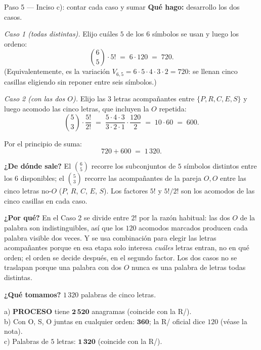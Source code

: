 \documentclass[11pt]{article}
\begin{document}
\begin{paso}{Paso 5 --- Inciso c): contar cada caso y sumar}
\textbf{Qué hago:} desarrollo los dos casos.

\emph{Caso 1 (todas distintas).} Elijo cuáles $5$ de los $6$ símbolos se usan y luego los ordeno:
\[
\binom{6}{5}\cdot 5! \;=\; 6\cdot 120 \;=\; 720 .
\]
(Equivalentemente, es la variación $V_{6,5}=6\cdot5\cdot4\cdot3\cdot2=720$: se llenan cinco casillas eligiendo
sin reponer entre seis símbolos.)

\emph{Caso 2 (con las dos $O$).} Elijo las $3$ letras acompañantes entre $\{P,R,C,E,S\}$ y luego acomodo las
cinco letras, que incluyen la $O$ repetida:
\[
\binom{5}{3}\cdot\frac{5!}{2!} \;=\; \frac{5\cdot4\cdot3}{3\cdot2\cdot1}\cdot\frac{120}{2}
\;=\; 10\cdot 60 \;=\; 600 .
\]

Por el principio de suma:
\[
720 + 600 \;=\; 1\,320 .
\]

\textbf{¿De dónde sale?} El $\binom{6}{5}$ recorre los subconjuntos de $5$ símbolos distintos entre los $6$
disponibles; el $\binom{5}{3}$ recorre las acompañantes de la pareja $O,O$ entre las cinco letras no-$O$
($P$, $R$, $C$, $E$, $S$). Los factores $5!$ y $5!/2!$ son los acomodos de las cinco casillas en cada caso.

\textbf{¿Por qué?} En el Caso 2 se divide entre $2!$ por la razón habitual: las dos $O$ de la palabra son
indistinguibles, así que los $120$ acomodos marcados producen cada palabra visible dos veces. Y se usa
combinación para elegir las letras acompañantes porque en esa etapa solo interesa \emph{cuáles} letras
entran, no en qué orden; el orden se decide después, en el segundo factor. Los dos casos no se traslapan
porque una palabra con dos $O$ nunca es una palabra de letras todas distintas.

\textbf{¿Qué tomamos?} $1\,320$ palabras de cinco letras.
\end{paso}

\begin{resp}
a) \textbf{PROCESO} tiene $\mathbf{2\,520}$ anagramas (coincide con la R/).\\
b) Con O, S, O juntas en cualquier orden: $\mathbf{360}$; la R/ oficial dice $120$ (véase la nota).\\
c) Palabras de $5$ letras: $\mathbf{1\,320}$ (coincide con la R/).
\end{resp}
\end{document}
